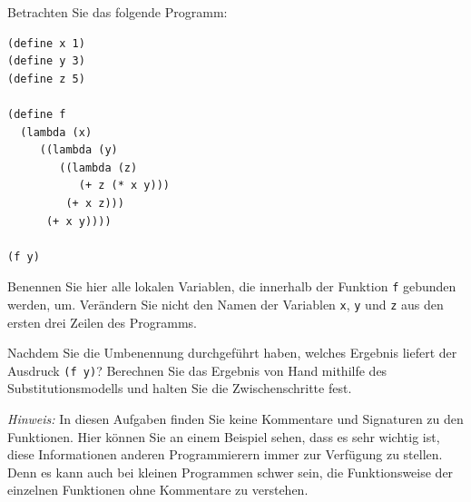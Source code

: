 \begin{aufgabe}
  Betrachten Sie das folgende Programm:

\begin{verbatim}
(define x 1)
(define y 3)
(define z 5)

(define f
  (lambda (x)   
     ((lambda (y)
        ((lambda (z)
           (+ z (* x y)))
         (+ x z)))
      (+ x y))))

(f y)
\end{verbatim}

  Benennen Sie hier alle lokalen Variablen, die innerhalb der Funktion
  \verb"f" gebunden werden, um. Verändern Sie nicht den Namen der
  Variablen \verb"x", \verb"y" und \verb"z" aus den ersten drei Zeilen
  des Programms.

  Nachdem Sie die Umbenennung durchgeführt haben, welches Ergebnis liefert
  der Ausdruck \verb"(f y)"? Berechnen Sie das Ergebnis von Hand mithilfe
  des Substitutionsmodells und halten Sie die Zwischenschritte fest.

  \noindent \emph{Hinweis:} In diesen Aufgaben finden Sie keine
  Kommentare und Signaturen zu den Funktionen. Hier können Sie an einem
  Beispiel sehen, dass es sehr wichtig ist, diese Informationen
  anderen Programmierern immer zur Verfügung zu stellen. Denn es kann
  auch bei kleinen Programmen schwer sein, die Funktionsweise der
  einzelnen Funktionen ohne Kommentare zu verstehen.
\end{aufgabe}

